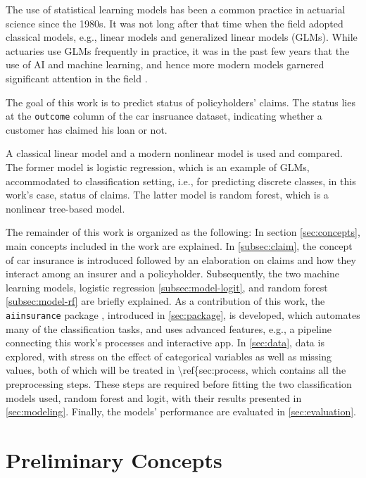 \documentclass{article}
\begin{document}
The use of statistical learning models has been a common practice in
actuarial science since the 1980s. It was not long after that time when
the field adopted classical models, e.g., linear models and generalized
linear models (GLMs). While actuaries use GLMs frequently in practice,
it was in the past few years that the use of AI and machine learning,
and hence more modern models garnered significant attention in the field
\cite{rev1}.

The goal of this work is to predict status of policyholders' claims. The
status lies at the \texttt{outcome} column of the car insruance dataset,
indicating whether a customer has claimed his loan or not.

A classical linear model and a modern nonlinear model is used and
compared. The former model is logistic regression, which is an example
of GLMs, accommodated to classification setting, i.e., for predicting
discrete classes, in this work's case, status of claims. The latter
model is random forest, which is a nonlinear tree-based model.

The remainder of this work is organized as the following: In section
\ref{sec:concepts}, main concepts included in the work are explained. In
\ref{subsec:claim}, the concept of car insurance is introduced followed
by an elaboration on claims and how they interact among an insurer and a
policyholder. Subsequently, the two machine learning models, logistic
regression \ref{subsec:model-logit}, and random forest
\ref{subsec:model-rf} are briefly explained. As a contribution of this
work, the \texttt{aiinsurance} package \cite{package}, introduced in
\ref{sec:package}, is developed, which automates many of the
classification tasks, and uses advanced features, e.g., a pipeline
connecting this work's processes and interactive app. In \ref{sec:data},
data is explored, with stress on the effect of categorical variables as
well as missing values, both of which will be treated in
\textbackslash ref\{sec:process, which contains all the preprocessing
steps. These steps are required before fitting the two classification
models used, random forest and logit, with their results presented in
\ref{sec:modeling}. Finally, the models' performance are evaluated in
\ref{sec:evaluation}.

\newpage

\hypertarget{preliminary-concepts}{%
\section{\texorpdfstring{Preliminary Concepts
\label{sec:concepts}}{Preliminary Concepts }}\label{preliminary-concepts}}
\end{document}
